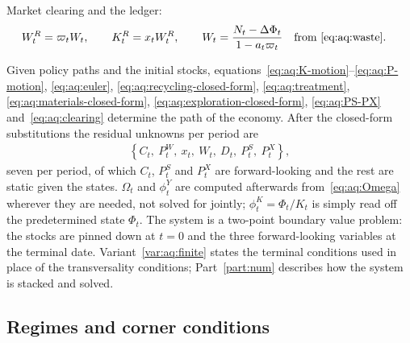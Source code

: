  Market clearing and the ledger:
\begin{align}
W^R_t &= \varpi_tW_t,
\qquad K^R_t = x_tW^R_t,
\qquad
W_t = \frac{N_t-\Delta\Phi_t}{1-a_t\varpi_t}\quad\text{from~\eqref{eq:aq:waste}}.
\label{eq:aq:clearing}
\end{align}

 Given policy paths and the initial stocks, equations~\eqref{eq:aq:K-motion}--\eqref{eq:aq:P-motion}, \eqref{eq:aq:euler}, \eqref{eq:aq:recycling-closed-form}, \eqref{eq:aq:treatment}, \eqref{eq:aq:materials-closed-form}, \eqref{eq:aq:exploration-closed-form}, \eqref{eq:aq:PS-PX} and~\eqref{eq:aq:clearing} determine the path of the economy. After the closed-form substitutions the residual unknowns per period are
\begin{align*}
\left\{C_t,\ P^W_t,\ x_t,\ W_t,\ D_t,\ P^S_t,\ P^X_t\right\},
\end{align*}
seven per period, of which $C_t$, $P^S_t$ and $P^X_t$ are forward-looking and the rest are static given the states. $\Omega_t$ and $\phi^Y_t$ are computed afterwards from~\eqref{eq:aq:Omega} wherever they are needed, not solved for jointly; $\phi^K_t=\Phi_t/K_t$ is simply read off the predetermined state $\Phi_t$. The system is a two-point boundary value problem: the stocks are pinned down at $t=0$ and the three forward-looking variables at the terminal date. Variant~\ref{var:aq:finite} states the terminal conditions used in place of the transversality conditions; Part~\ref{part:num} describes how the system is stacked and solved.

\subsection{Regimes and corner conditions}
\label{subsec:aq:regimes}


